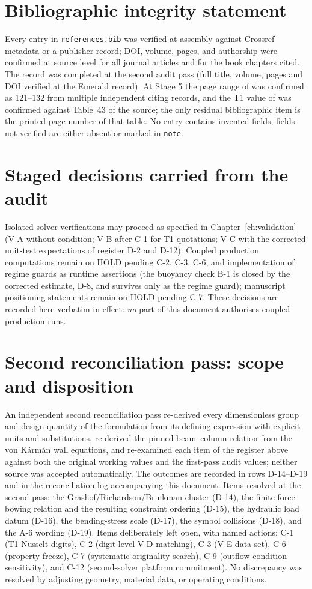 \section{Bibliographic integrity statement}
Every entry in \texttt{references.bib} was verified at assembly against Crossref metadata or a
publisher record; DOI, volume, pages, and authorship were confirmed at source level for all
journal articles and for the book chapters cited. The record \cite{gupta2024photothermo} was
completed at the second audit pass (full title, volume, pages and DOI verified at the Emerald
record). At Stage 5 the page range of \cite{hood1974navier} was confirmed as 121--132 from multiple
independent citing records, and the T1 value of \cite{shah1978laminar} was confirmed against
Table~43 of the source; the only residual bibliographic item is the printed page number of that
table. No entry contains invented fields; fields not verified are either absent or marked in
\texttt{note}.

\section{Staged decisions carried from the audit}
Isolated solver verifications may proceed as specified in Chapter~\ref{ch:validation} (V-A without
condition; V-B after C-1 for T1 quotations; V-C with the corrected unit-test expectations of
register D-2 and D-12). Coupled production computations remain on HOLD pending C-2, C-3,
C-6, and implementation of regime guards as runtime assertions (the buoyancy check B-1 is closed
by the corrected estimate, D-8, and survives only as the regime guard); manuscript positioning
statements remain on HOLD pending C-7. These decisions are recorded here verbatim in effect: \emph{no} part
of this document authorises coupled production runs.

\section{Second reconciliation pass: scope and disposition}
\label{sec:secondpass}
An independent second reconciliation pass re-derived every dimensionless group and design
quantity of the formulation from its defining expression with explicit units and substitutions,
re-derived the pinned beam--column relation from the von K\'arm\'an wall equations, and
re-examined each item of the register above against both the original working values and the
first-pass audit values; neither source was accepted automatically. The outcomes are recorded in
rows D-14--D-19 and in the reconciliation log accompanying this document. Items resolved at the
second pass: the Grashof/Richardson/Brinkman cluster (D-14), the finite-force bowing relation and
the resulting constraint ordering (D-15), the hydraulic load datum (D-16), the bending-stress
scale (D-17), the symbol collisions (D-18), and the A-6 wording (D-19). Items deliberately left
open, with named actions: C-1 (T1 Nusselt digits), C-2 (digit-level V-D matching), C-3 (V-E data
set), C-6 (property freeze), C-7 (systematic originality search), C-9 (outflow-condition
sensitivity), and C-12 (second-solver platform commitment). No discrepancy was resolved by
adjusting geometry, material data, or operating conditions.

